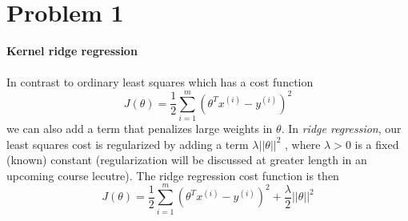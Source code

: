 \documentclass{article}
\title{Problem Set #2: Kernels, SVMs, and Theory}
\author{Eitan Joseph \and Caroline Wang}
\date{\today}
\begin{document}
\maketitle

\section{Problem 1}
\textbf{Kernel ridge regression\\\\}
In contrast to ordinary least squares which has a cost function\begin{equation}
    J(\theta) = \frac{1}{2}\sum_{i=1}^{m}\left(\theta^T x^{(i)}-y^{(i)}\right )^2
\end{equation}we can also add a term that penalizes large weights in $\theta $. In \textit{ridge regression}, our least
squares cost is regularized by adding a term $\lambda ||\theta ||^2$
, where $\lambda>0$ is a fixed (known) constant
(regularization will be discussed at greater length in an upcoming course lecutre). The ridge regression cost function is then\begin{equation*}
     J(\theta) = \frac{1}{2}\sum_{i=1}^{m}\left(\theta^T x^{(i)}-y^{(i)}\right )^2 + \frac{\lambda}{2}||\theta ||^2
\end{equation*}
\end{document}
